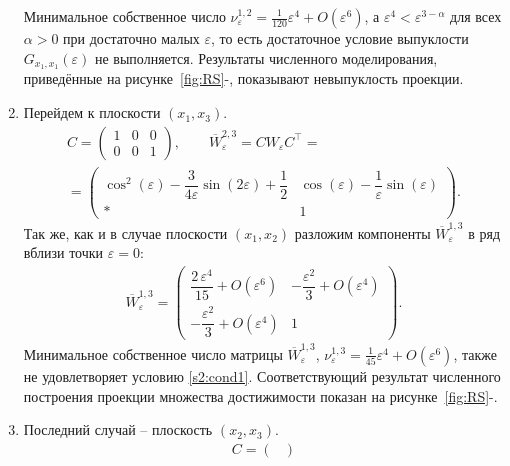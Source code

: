 \documentclass[../main.tex]{subfiles}
\begin{document}
\begin{enumerate}
        Минимальное собственное число $ \nu^{1,2}_{\varepsilon} = \frac{1}{120}\varepsilon^4 + O(\varepsilon^6)$, а $ \varepsilon^4 < \varepsilon^{3-\alpha} $ для всех $ \alpha > 0 $ при достаточно малых $ \varepsilon $, то есть достаточное условие выпуклости $ G_{x_1, x_1}(\varepsilon) $ не выполняется. 
Результаты численного моделирования, приведённые на рисунке~\ref{fig:RS}-, показывают невыпуклость проекции. 
        \item Перейдем к плоскости $ (x_1,x_3) $. 
        \begin{gather*}
            C = \begin{pmatrix}
                1 & 0 & 0 \\
                0 & 0 & 1
            \end{pmatrix}, \qquad
            \overline{W}_{\varepsilon}^{2,3} =  C W_{\varepsilon} C^{\top}  = \\ =\begin{pmatrix}
                \cos^2(\varepsilon)-\dfrac{3}{4\varepsilon}\sin(2\varepsilon)+\dfrac{1}{2} & 
                \cos\left(\varepsilon \right)-\dfrac{1}{\varepsilon} \sin\left(\varepsilon \right) \\ 
                * & 1
            \end{pmatrix}.
        \end{gather*}
        Так же, как и в случае плоскости $ (x_1,x_2) $ разложим компоненты $     \overline{W}_{\varepsilon}^{1,3}  $ в ряд вблизи точки $ \varepsilon = 0 $:
        \begin{gather*}
            \overline{W}_{\varepsilon}^{1,3} = \begin{pmatrix} 
                \dfrac{2\,\varepsilon ^4}{15} + O(\varepsilon^6) &
                -\dfrac{\varepsilon^2}{3}+ O(\varepsilon ^4)\\[8pt]
                -\dfrac{\varepsilon^2}{3} + O(\varepsilon^4) & 1 \end{pmatrix}.
        \end{gather*}
        Минимальное собственное число матрицы $  \overline{W}_{\varepsilon}^{1,3}  $, $ \nu^{1,3}_{\varepsilon} =   \frac{1}{45}\varepsilon^4 + O(\varepsilon^6) $, также не удовлетворяет условию \eqref{s2:cond1}. 
Соответствующий результат численного построения проекции множества достижимости показан на рисунке~\ref{fig:RS}-.
        \item Последний случай -- плоскость $ (x_2,x_3) $.
        \begin{gather*}
            C = \begin{pmatrix}

\end{pmatrix}
\end{gather*}
\end{enumerate}
\end{document}
